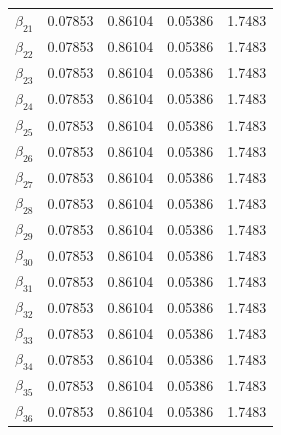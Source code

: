 \begin{table} [H]
\begin{tabularx}{\textwidth}{l|XXXX}
		$\beta_{21}$ & 0.07853 & 0.86104 & 0.05386 & 1.7483\\
		$\beta_{22}$ & 0.07853 & 0.86104 & 0.05386 & 1.7483\\
		$\beta_{23}$ & 0.07853 & 0.86104 & 0.05386 & 1.7483\\
		$\beta_{24}$ & 0.07853 & 0.86104 & 0.05386 & 1.7483\\
		$\beta_{25}$ & 0.07853 & 0.86104 & 0.05386 & 1.7483\\
		$\beta_{26}$ & 0.07853 & 0.86104 & 0.05386 & 1.7483\\
		$\beta_{27}$ & 0.07853 & 0.86104 & 0.05386 & 1.7483\\
		$\beta_{28}$ & 0.07853 & 0.86104 & 0.05386 & 1.7483\\
		$\beta_{29}$ & 0.07853 & 0.86104 & 0.05386 & 1.7483\\
		$\beta_{30}$ & 0.07853 & 0.86104 & 0.05386 & 1.7483\\
		$\beta_{31}$ & 0.07853 & 0.86104 & 0.05386 & 1.7483\\
		$\beta_{32}$ & 0.07853 & 0.86104 & 0.05386 & 1.7483\\
		$\beta_{33}$ & 0.07853 & 0.86104 & 0.05386 & 1.7483\\
		$\beta_{34}$ & 0.07853 & 0.86104 & 0.05386 & 1.7483\\
		$\beta_{35}$ & 0.07853 & 0.86104 & 0.05386 & 1.7483\\
		$\beta_{36}$ & 0.07853 & 0.86104 & 0.05386 & 1.7483\\ \hline
	\end{tabularx}
\end{table}
\fi